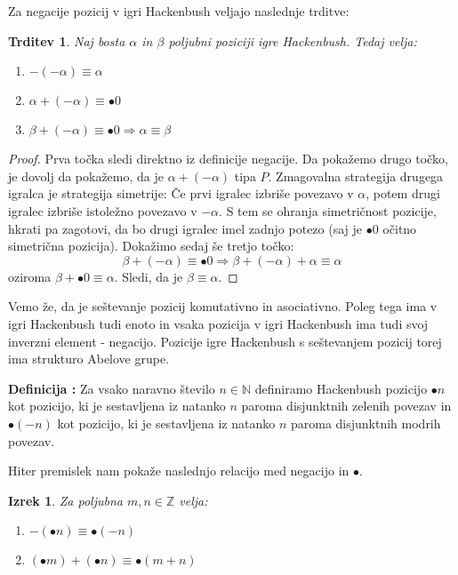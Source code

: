 \documentclass[a4paper, 10pt]{article}
\newtheorem{izr}{Izrek}
\newtheorem{trd}{Trditev}
\newcounter{defcount}
\newenvironment{definicija}{\begin{flushleft}\refstepcounter{defcount}\textbf{Definicija \arabic{defcount}:}}{\hfill\end{flushleft}}
\newcommand{\mth}[1]{\ensuremath{\mathbb{#1}}}
\newcommand{\Z}{\mth{Z}}
\newcommand{\N}{\mth{N}}
\begin{document}
	Za negacije pozicij v igri Hackenbush veljajo naslednje trditve:
	
	\begin{trd}
		\label{trd:hackenbush}
		Naj bosta $\alpha$ in $\beta$ poljubni poziciji igre Hackenbush. Tedaj velja: \begin{enumerate}
			\item $-(-\alpha)\equiv \alpha$
			\item $\alpha + (-\alpha)\equiv \bullet 0$
			\item $\beta + (-\alpha) \equiv \bullet 0 \Rightarrow \alpha \equiv \beta$
		\end{enumerate}
	\end{trd}
	\begin{proof}
		Prva točka sledi direktno iz definicije negacije. Da pokažemo drugo točko, je dovolj da pokažemo, da je $\alpha + (-\alpha)$ tipa $P$. Zmagovalna strategija drugega igralca je strategija simetrije: Če prvi igralec izbriše povezavo v $\alpha$, potem drugi igralec izbriše istoležno povezavo v $-\alpha$. S tem se ohranja simetričnost pozicije, hkrati pa zagotovi, da bo drugi igralec imel zadnjo potezo (saj je $\bullet 0$ očitno simetrična pozicija).
		Dokažimo sedaj še tretjo točko: $$ \beta + (-\alpha) \equiv \bullet 0 \Rightarrow \beta + (-\alpha) + \alpha \equiv \alpha$$ oziroma $\beta + \bullet 0 \equiv \alpha$. Sledi, da je $\beta\equiv\alpha$.
	\end{proof}
	
	Vemo že, da je seštevanje pozicij komutativno in asociativno. Poleg tega ima v igri Hackenbush tudi enoto in vsaka pozicija v igri Hackenbush ima tudi svoj inverzni element - negacijo. Pozicije igre Hackenbush s seštevanjem pozicij torej ima strukturo Abelove grupe.
	
	\begin{definicija}
		Za vsako naravno število $n\in\N$ definiramo Hackenbush pozicijo $\bullet n$ kot pozicijo, ki je sestavljena iz natanko $n$ paroma disjunktnih zelenih povezav in $\bullet(-n)$ kot pozicijo, ki je sestavljena iz natanko $n$ paroma disjunktnih modrih povezav.
	\end{definicija}
	Hiter premislek nam pokaže naslednjo relacijo med negacijo in $\bullet$.
	\begin{izr}
		Za poljubna $m, n \in \Z$ velja: \begin{enumerate}
			\item $-(\bullet n)\equiv \bullet(-n)$
			\item $(\bullet m) + (\bullet n) \equiv \bullet(m + n)$
		\end{enumerate}
	\end{izr}
	
\end{document}
